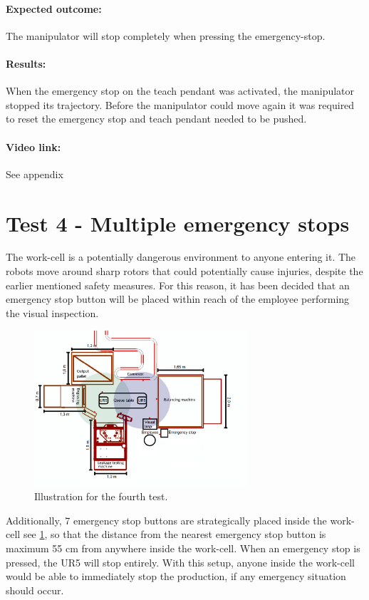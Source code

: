 \paragraph{Expected outcome:}
The manipulator will stop completely when pressing the emergency-stop.

\paragraph{Results: }
When the emergency stop on the teach pendant was activated, the manipulator stopped its trajectory. Before the manipulator could move again it was required to reset the emergency stop and teach pendant needed to be pushed.\\

\paragraph{Video link: }
See appendix \cite{testfilm}

\section{Test 4 - Multiple emergency stops}
The work-cell is a potentially dangerous environment to anyone entering it. The robots move around sharp rotors that could potentially cause injuries, despite the earlier mentioned safety measures. For this reason, it has been decided that an emergency stop button will be placed within reach of the employee performing the visual inspection.
\begin{figure}[H]
    \centering
    \includegraphics[width=0.7\textwidth]{Design/Work_cell_10.png}
    \caption{Illustration for the fourth test.}
    \label{fig:fourthtest}
\end{figure}
Additionally, 7 emergency stop buttons are strategically placed inside the work-cell see \ref{fig:fourthtest}, so that the distance from the nearest emergency stop button is maximum 55 cm from anywhere inside the work-cell. When an emergency stop is pressed, the UR5 will stop entirely. With this setup, anyone inside the work-cell would be able to immediately stop the production, if any emergency situation should occur. \\
